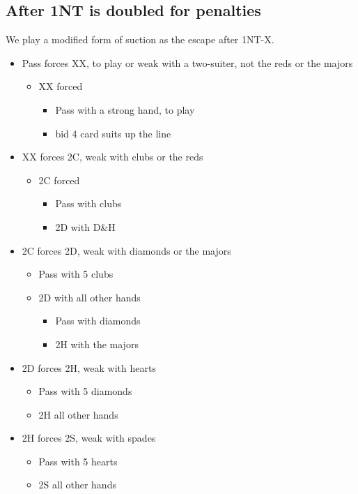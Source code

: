 \documentclass[a4paper,12pt]{article}
\begin{document}
\subsection{After 1NT is doubled for penalties}

We play a modified form of suction as the escape after 1NT-X.

\begin{itemize}
\item Pass forces XX, to play or weak with a two-suiter, not the reds or the majors
	\begin{itemize}
	\item XX forced
		\begin{itemize}
		\item Pass with a strong hand, to play
		\item bid 4 card suits up the line
		\end{itemize}
	\end{itemize}
\item XX forces 2C, weak with clubs or the reds
	\begin{itemize}
	\item 2C forced
		\begin{itemize}
		\item Pass with clubs
		\item 2D with D\&H
		\end{itemize}
	\end{itemize}
\item 2C forces 2D, weak with diamonds or the majors
	\begin{itemize}
	\item Pass with 5 clubs
	\item 2D with all other hands
		\begin{itemize}
		\item Pass with diamonds
		\item 2H with the majors
		\end{itemize}
	\end{itemize}
\item 2D forces 2H, weak with hearts
	\begin{itemize}
	\item Pass with 5 diamonds
	\item 2H all other hands
	\end{itemize}
\item 2H forces 2S, weak with spades
	\begin{itemize}
	\item Pass with 5 hearts
	\item 2S all other hands
	\end{itemize}
\end{itemize}
\end{document}
